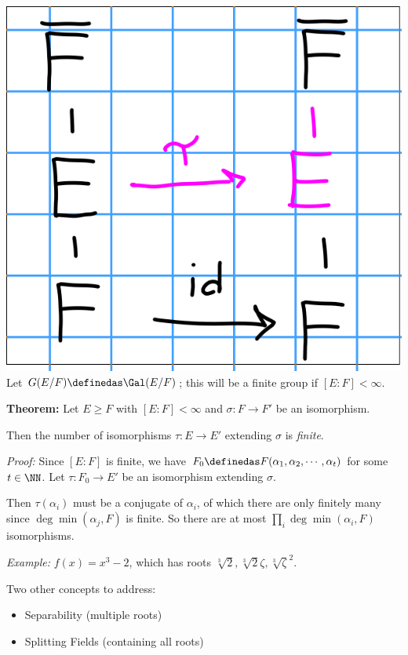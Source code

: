 \includegraphics{figures/2019-10-01-09:51.png}\\

Let \(G(E/F) \definedas \Gal(E/F)\); this will be a finite group if
\([E: F] < \infty\).

\textbf{Theorem:} Let \(E \geq F\) with \([E: F] < \infty\) and
\(\sigma: F \to F'\) be an isomorphism.

Then the number of isomorphisms \(\tau: E \to E'\) extending \(\sigma\)
is \emph{finite}.

\emph{Proof:} Since \([E: F]\) is finite, we have
\(F_0 \definedas F(\alpha_1, \alpha_2, \cdots, \alpha_t)\) for some
\(t\in \NN\). Let \(\tau: F_0 \to E'\) be an isomorphism extending
\(\sigma\).

Then \(\tau(\alpha_i)\) must be a conjugate of \(\alpha_i\), of which
there are only finitely many since \(\deg \min(\alpha_j, F)\) is finite.
So there are at most \(\prod_i \deg\min(\alpha_i, F)\) isomorphisms.

\emph{Example:} \(f(x) = x^3 - 2\), which has roots
\(\sqrt[3] 2, \sqrt[3] 2 \zeta, \sqrt[3] \zeta^2\).

Two other concepts to address:

\begin{itemize}
\item
  Separability (multiple roots)
\item
  Splitting Fields (containing all roots)
\end{itemize}

